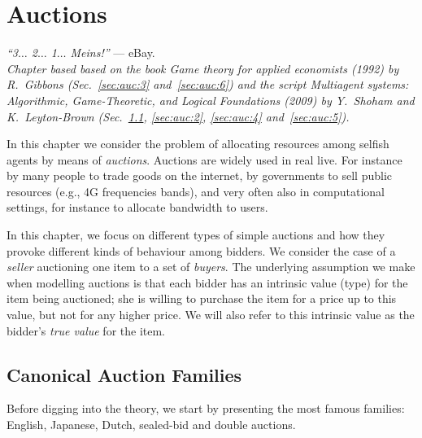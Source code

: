 \ifx \globalmark \undefined %
	
\else
\fi




\chapter{Auctions}
{\large{\itshape
``3$\dotsc$ 2$\dotsc$ 1$\dotsc$ Meins!''} --- eBay.\\
}
  {\small{\itshape
Chapter based based
on the book \emph{Game theory for applied economists} (1992) by R.\ Gibbons (Sec.~\ref{sec:auc:3} and~\ref{sec:auc:6}) and the script \emph{Multiagent systems: Algorithmic, Game-Theoretic, and Logical Foundations} (2009) by Y.\ Shoham and K.\ Leyton-Brown (Sec.~\ref{sec:auc:1}, \ref{sec:auc:2}, \ref{sec:auc:4} and~\ref{sec:auc:5}).}\\
}
\label{chap:Auct}


In this chapter we consider the problem of allocating resources among selfish agents by means of \emph{auctions}. Auctions are widely used in real live. For instance by many people to trade goods on the internet, by governments to sell public resources (e.g., 4G frequencies bands), and very often also in computational settings, for instance to allocate bandwidth to users.

In this chapter, we focus on different types of simple auctions and how they provoke different kinds of behaviour among bidders. We consider the case of a \emph{seller} auctioning one item to a set of \emph{buyers}.
The underlying assumption we make when modelling auctions is that each bidder has an intrinsic value (type) for the item being auctioned; she is willing to purchase the item for a price up to this value, but not for any higher price. We will also refer to this intrinsic value as the bidder's \emph{true value} for the item.



\section{Canonical Auction Families}
\label{sec:auc:1}
Before digging into the theory, we start by presenting the most famous families: English, Japanese, Dutch, sealed-bid and double auctions.

